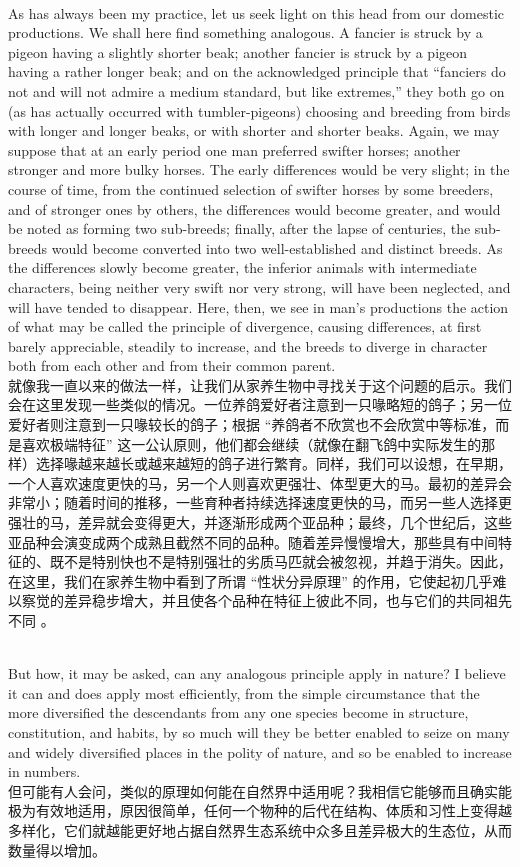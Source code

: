 \documentclass{article}
\begin{document}
\\
As has always been my practice, let us seek light on this head from our domestic productions. We shall here find something analogous. A fancier is struck by a pigeon having a slightly shorter beak; another fancier is struck by a pigeon having a rather longer beak; and on the acknowledged principle that “fanciers do not and will not admire a medium standard, but like extremes,” they both go on (as has actually occurred with tumbler-pigeons) choosing and breeding from birds with longer and longer beaks, or with shorter and shorter beaks. Again, we may suppose that at an early period one man preferred swifter horses; another stronger and more bulky horses. The early differences would be very slight; in the course of time, from the continued selection of swifter horses by some breeders, and of stronger ones by others, the differences would become greater, and would be noted as forming two sub-breeds; finally, after the lapse of centuries, the sub-breeds would become converted into two well-established and distinct breeds. As the differences slowly become greater, the inferior animals with intermediate characters, being neither very swift nor very strong, will have been neglected, and will have tended to disappear. Here, then, we see in man’s productions the action of what may be called the principle of divergence, causing differences, at first barely appreciable, steadily to increase, and the breeds to diverge in character both from each other and from their common parent.\\
就像我一直以来的做法一样，让我们从家养生物中寻找关于这个问题的启示。我们会在这里发现一些类似的情况。一位养鸽爱好者注意到一只喙略短的鸽子；另一位爱好者则注意到一只喙较长的鸽子；根据 “养鸽者不欣赏也不会欣赏中等标准，而是喜欢极端特征” 这一公认原则，他们都会继续（就像在翻飞鸽中实际发生的那样）选择喙越来越长或越来越短的鸽子进行繁育。同样，我们可以设想，在早期，一个人喜欢速度更快的马，另一个人则喜欢更强壮、体型更大的马。最初的差异会非常小；随着时间的推移，一些育种者持续选择速度更快的马，而另一些人选择更强壮的马，差异就会变得更大，并逐渐形成两个亚品种；最终，几个世纪后，这些亚品种会演变成两个成熟且截然不同的品种。随着差异慢慢增大，那些具有中间特征的、既不是特别快也不是特别强壮的劣质马匹就会被忽视，并趋于消失。因此，在这里，我们在家养生物中看到了所谓 “性状分异原理” 的作用，它使起初几乎难以察觉的差异稳步增大，并且使各个品种在特征上彼此不同，也与它们的共同祖先不同 。 

\\
But how, it may be asked, can any analogous principle apply in nature? I believe it can and does apply most efficiently, from the simple circumstance that the more diversified the descendants from any one species become in structure, constitution, and habits, by so much will they be better enabled to seize on many and widely diversified places in the polity of nature, and so be enabled to increase in numbers.\\
但可能有人会问，类似的原理如何能在自然界中适用呢？我相信它能够而且确实能极为有效地适用，原因很简单，任何一个物种的后代在结构、体质和习性上变得越多样化，它们就越能更好地占据自然界生态系统中众多且差异极大的生态位，从而数量得以增加。 
\end{document}
